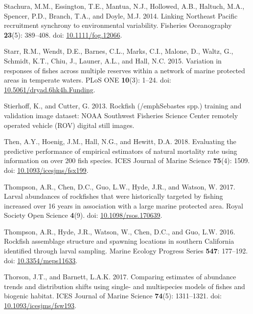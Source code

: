 \documentclass[
  english,
  a4paper,
]{article}
\newlength{\cslhangindent}
\newlength{\cslentryspacingunit} %
\newenvironment{CSLReferences}[2] %
 {%
  \setlength{\parindent}{0pt}
  \ifodd #1
  \let\oldpar\par
  \def\par{\hangindent=\cslhangindent\oldpar}
  \fi
  \setlength{\parskip}{#2\cslentryspacingunit}
 }%
 {}
\begin{document}
\begin{CSLReferences}{1}{0}
\leavevmode{}%
Stachura, M.M., Essington, T.E., Mantua, N.J., Hollowed, A.B., Haltuch, M.A., Spencer, P.D., Branch, T.A., and Doyle, M.J. 2014. {Linking Northeast Pacific recruitment synchrony to environmental variability}. Fisheries Oceanography \textbf{23}(5): 389--408. doi: \href{https://doi.org/10.1111/fog.12066}{10.1111/fog.12066}.

\leavevmode{}%
Starr, R.M., Wendt, D.E., Barnes, C.L., Marks, C.I., Malone, D., Waltz, G., Schmidt, K.T., Chiu, J., Launer, A.L., and Hall, N.C. 2015. {Variation in responses of fishes across multiple reserves within a network of marine protected areas in temperate waters}. PLoS ONE \textbf{10}(3): 1--24. doi: \href{https://doi.org/10.5061/dryad.6hk4h.Funding}{10.5061/dryad.6hk4h.Funding}.

\leavevmode{}%
Stierhoff, K., and Cutter, G. 2013. {Rockfish (/emph{Sebastes spp.}) training and validation image dataset: NOAA Southwest Fisheries Science Center remotely operated vehicle (ROV) digital still images.}

\leavevmode{}%
Then, A.Y., Hoenig, J.M., Hall, N.G., and Hewitt, D.A. 2018. {Evaluating the predictive performance of empirical estimators of natural mortality rate using information on over 200 fish species}. ICES Journal of Marine Science \textbf{75}(4): 1509. doi: \href{https://doi.org/10.1093/icesjms/fsx199}{10.1093/icesjms/fsx199}.

\leavevmode{}%
Thompson, A.R., Chen, D.C., Guo, L.W., Hyde, J.R., and Watson, W. 2017. {Larval abundances of rockfishes that were historically targeted by fishing increased over 16 years in association with a large marine protected area}. Royal Society Open Science \textbf{4}(9). doi: \href{https://doi.org/10.1098/rsos.170639}{10.1098/rsos.170639}.

\leavevmode{}%
Thompson, A.R., Hyde, J.R., Watson, W., Chen, D.C., and Guo, L.W. 2016. {Rockfish assemblage structure and spawning locations in southern California identified through larval sampling}. Marine Ecology Progress Series \textbf{547}: 177--192. doi: \href{https://doi.org/10.3354/meps11633}{10.3354/meps11633}.

\leavevmode{}%
Thorson, J.T., and Barnett, L.A.K. 2017. {Comparing estimates of abundance trends and distribution shifts using single- and multispecies models of fishes and biogenic habitat}. ICES Journal of Marine Science \textbf{74}(5): 1311--1321. doi: \href{https://doi.org/10.1093/icesjms/fsw193}{10.1093/icesjms/fsw193}.


\end{CSLReferences}
\end{document}
